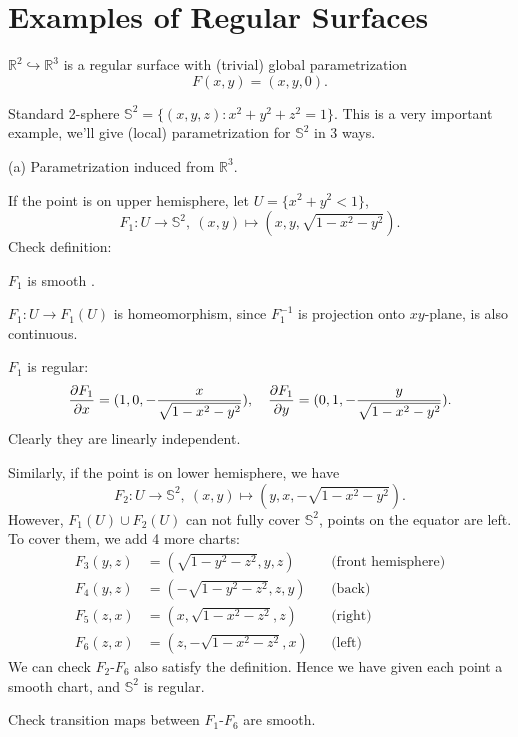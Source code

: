 \section{Examples of Regular Surfaces}

\begin{example}[1]
    \(\mathbb{R}^2\hookrightarrow\mathbb{R}^3\) is a regular surface with (trivial)
    global parametrization \[
        F(x,y)=(x,y,0)
    .\] 
\end{example}

\begin{example}[2]
    Standard 2-sphere \(\mathbb{S}^2=\{(x,y,z):x^2+y^2+z^2=1\}\). This is a very
    important example, we'll give (local) parametrization for \(\mathbb{S}^2\)
    in 3 ways.
\end{example}
\noindent (a) Parametrization induced from \(\mathbb{R}^3\).

If the point is on upper hemisphere, let \(U=\{x^2+y^2<1\}\), \[
    F_1\colon U\to \mathbb{S}^2,\ (x,y)\mapsto (x,y,\sqrt{1-x^2-y^2}).
\] Check definition:

\(F_1\) is smooth \checkmark{}. 

\(F_1\colon U\to F_1(U)\) is homeomorphism, since \(F_1^{-1}\) is
projection onto \(xy\)-plane, is also continuous.

\(F_1\) is regular: \[
    \pdv{F_1}{x}=(1,0,-\frac{x}{\sqrt{1-x^2-y^2}}),\quad
    \pdv{F_1}{y}=(0,1,-\frac{y}{\sqrt{1-x^2-y^2}})
.\] Clearly they are linearly independent.

Similarly, if the point is on lower hemisphere, we have \[
    F_2\colon U\to \mathbb{S}^2,\ (x,y)\mapsto (y,x,-\sqrt{1-x^2-y^2})
.\] However, \(F_1(U)\cup F_2(U)\) can not fully cover \(\mathbb{S}^2\), points on
the equator are left. To cover them, we add 4 more charts:
\begin{align*}
    F_3(y,z)&= (\sqrt{1-y^2-z^2},y,z) &&\text{(front hemisphere)} \\
    F_4(y,z)&= (-\sqrt{1-y^2-z^2},z,y) &&\text{(back)} \\
    F_5(z,x)&= (x,\sqrt{1-x^2-z^2},z) &&\text{(right)} \\
    F_6(z,x)&= (z,-\sqrt{1-x^2-z^2},x) &&\text{(left)}
\end{align*}
We can check \(F_2\)-\(F_6\) also satisfy the definition. Hence we have given each
point a smooth chart, and \(\mathbb{S}^2\) is regular.
\begin{exercise}
    Check transition maps between \(F_1\)-\(F_6\) are smooth.
\end{exercise}

